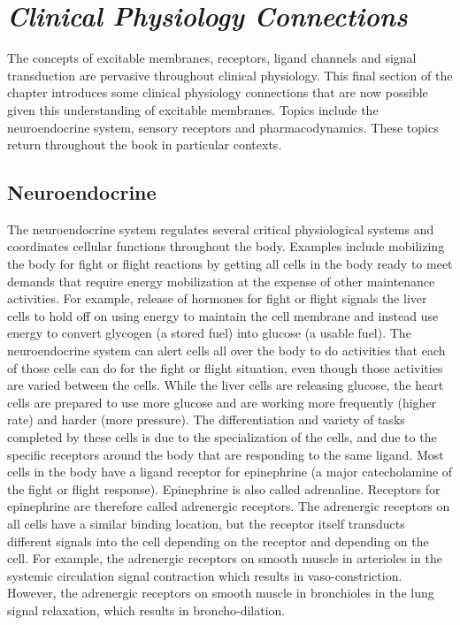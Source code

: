 \section{\textit{Clinical Physiology Connections}}

The concepts of excitable membranes, receptors, ligand channels and signal transduction are pervasive throughout clinical physiology. This final section of the chapter introduces some clinical physiology connections that are now possible given this understanding of excitable membranes. Topics include the neuroendocrine system, sensory receptors and pharmacodynamics. These topics return throughout the book in particular contexts.

\subsection{Neuroendocrine}

The neuroendocrine system regulates several critical physiological systems and coordinates cellular functions throughout the body. Examples include mobilizing the body for fight or flight reactions by getting all cells in the body ready to meet demands that require energy mobilization at the expense of other maintenance activities. For example, release of hormones for fight or flight signals the liver cells to hold off on using energy to maintain the cell membrane and instead use energy to convert glycogen (a stored fuel) into glucose (a usable fuel). The neuroendocrine system can alert cells all over the body to do activities that each of those cells can do for the fight or flight situation, even though those activities are varied between the cells. While the liver cells are releasing glucose, the heart cells are prepared to use more glucose and are working more frequently (higher rate) and harder (more pressure). The differentiation and variety of tasks completed by these cells is due to the specialization of the cells, and due to the specific receptors around the body that are responding to the same ligand. Most cells in the body have a ligand receptor for epinephrine (a major catecholamine of the fight or flight response). Epinephrine is also called adrenaline. Receptors for epinephrine are therefore called adrenergic receptors. The adrenergic receptors on all cells have a similar binding location, but the receptor itself transducts different signals into the cell depending on the receptor and depending on the cell. For example, the adrenergic receptors on smooth muscle in arterioles in the systemic circulation signal contraction which results in vaso-constriction. However, the adrenergic receptors on smooth muscle in bronchioles in the lung signal relaxation, which results in broncho-dilation.

